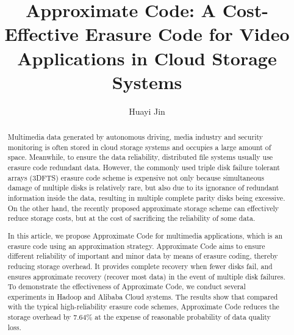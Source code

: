 \documentclass[sigconf]{acmart}
\begin{document}
\title{Approximate Code: A Cost-Effective Erasure Code for Video Applications in Cloud Storage Systems}

\author{Huayi Jin}



\begin{abstract}
Multimedia data generated by autonomous driving, media industry and security monitoring is often stored in cloud storage systems and occupies a large amount of space. Meanwhile, to ensure the data reliability, distributed file systems usually use erasure code redundant data. However, the commonly used triple disk failure tolerant arrays (3DFTS) erasure code scheme is expensive not only because simultaneous damage of multiple disks is relatively rare, but also due to its ignorance of redundant information inside the data, resulting in multiple complete parity disks being excessive. On the other hand, the recently proposed approximate storage scheme can effectively reduce storage costs, but at the cost of sacrificing the reliability of some data.

In this article, we propose Approximate Code for multimedia applications, which is an erasure code using an approximation strategy. Approximate Code aims to ensure different reliability of important and minor data by means of erasure coding, thereby reducing storage overhead. It provides complete recovery when fewer disks fail, and ensures approximate recovery (recover most data) in the event of multiple disk failures. To demonstrate the effectiveness of Approximate Code, we conduct several experiments in Hadoop and Alibaba Cloud systems. The results show that compared with the typical high-reliability erasure code schemes, Approximate Code reduces the storage overhead by 7.64\% at the expense of reasonable probability of data quality loss. 

\end{abstract}

%
%
\end{document}
